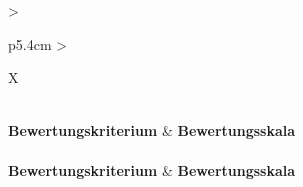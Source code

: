 {\small
\renewcommand{\arraystretch}{1.3}

\begin{xltabular}{\textwidth}{>{\raggedright\arraybackslash}p{5.4cm}
                              >{\raggedright\arraybackslash}X}
    \caption{Punkteskalen der Bewertungskriterien für die Nutzwertanalyse}
    \label{tab:punkteskala} \\
    \toprule
    \textbf{Bewertungskriterium} & \textbf{Bewertungsskala} \\
    \midrule
    \endfirsthead
     \\
    \toprule
    \textbf{Bewertungskriterium} & \textbf{Bewertungsskala} \\
    \midrule
    \endhead
    \bottomrule
    \endlastfoot


\end{xltabular}}
